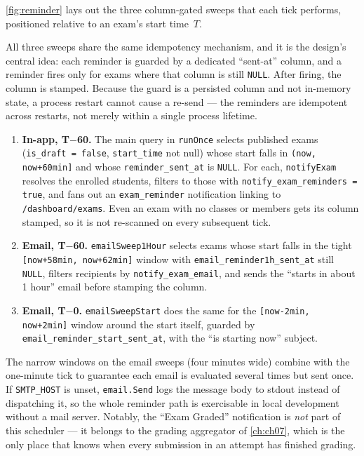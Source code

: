 \cref{fig:reminder} lays out the three column-gated sweeps that each tick
performs, positioned relative to an exam's start time~$T$.



All three sweeps share the same idempotency mechanism, and it is the design's
central idea: each reminder is guarded by a dedicated ``sent-at'' column, and a
reminder fires only for exams where that column is still \texttt{NULL}. After
firing, the column is stamped. Because the guard is a persisted column and not
in-memory state, a process restart cannot cause a re-send --- the reminders are
idempotent across restarts, not merely within a single process lifetime.

\begin{enumerate}
  \item \textbf{In-app, T$-$60.} The main query in \texttt{runOnce} selects
    published exams (\texttt{is\_draft = false}, \texttt{start\_time} not null)
    whose start falls in \texttt{(now, now+60min]} and whose
    \texttt{reminder\_sent\_at} is \texttt{NULL}. For each, \texttt{notifyExam}
    resolves the enrolled students, filters to those with
    \texttt{notify\_exam\_reminders = true}, and fans out an
    \texttt{exam\_reminder} notification linking to \texttt{/dashboard/exams}.
    Even an exam with no classes or members gets its column stamped, so it is
    not re-scanned on every subsequent tick.
  \item \textbf{Email, T$-$60.} \texttt{emailSweep1Hour} selects exams whose
    start falls in the tight \texttt{[now+58min, now+62min]} window with
    \texttt{email\_reminder1h\_sent\_at} still \texttt{NULL}, filters recipients
    by \texttt{notify\_exam\_email}, and sends the ``starts in about 1 hour''
    email before stamping the column.
  \item \textbf{Email, T$-$0.} \texttt{emailSweepStart} does the same for the
    \texttt{[now-2min, now+2min]} window around the start itself, guarded by
    \texttt{email\_reminder\_start\_sent\_at}, with the ``is starting now''
    subject.
\end{enumerate}

The narrow windows on the email sweeps (four minutes wide) combine with the
one-minute tick to guarantee each email is evaluated several times but sent
once. If \texttt{SMTP\_HOST} is unset, \texttt{email.Send} logs the message body
to stdout instead of dispatching it, so the whole reminder path is exercisable
in local development without a mail server. Notably, the ``Exam Graded''
notification is \emph{not} part of this scheduler --- it belongs to the grading
aggregator of \cref{ch:ch07}, which is the only place that knows when every
submission in an attempt has finished grading.

